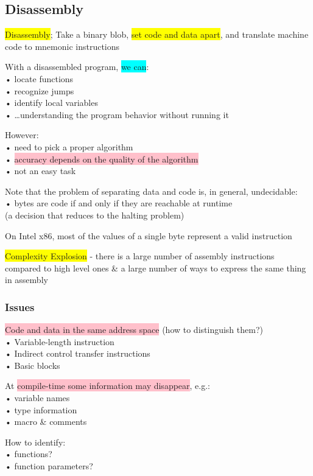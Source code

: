 \documentclass[]{project_plan}
\begin{document}
\subsection{Disassembly}
\colorbox{yellow}{Disassembly}; Take a binary blob, \colorbox{yellow}{set code and data apart}, and translate machine code to
mnemonic instructions

With a disassembled program, \colorbox{cyan}{we can}:\\
• locate functions\\
• recognize jumps\\
• identify local variables\\
• …understanding the program behavior without running it

However:\\
• need to pick a proper algorithm\\
• \colorbox{pink}{accuracy depends on the quality of the algorithm}\\
• not an easy task

Note that the problem of separating data and code is, in general, undecidable:\\
• bytes are code if and only if they are reachable at runtime\\
(a decision that reduces to the halting problem)

On Intel x86, most of the values of a single byte represent a valid instruction

\colorbox{yellow}{Complexity Explosion} - there is a large number of assembly instructions compared to high level ones \& a large number of ways to express the same thing in assembly

\subsubsection{Issues}

\colorbox{pink}{Code and data in the same address space} (how to distinguish them?)\\
• Variable-length instruction\\
• Indirect control transfer instructions\\
• Basic blocks

At \colorbox{pink}{compile-time some information may disappear}, e.g.:\\
• variable names\\
• type information\\
• macro \& comments

How to identify:\\
• functions?\\
• function parameters?
\end{document}
